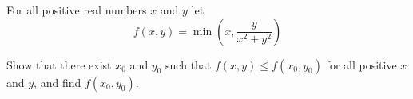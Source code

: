 For all positive real numbers $x$ and $y$ let\[f(x,y)=\min\left( x,\frac{y}{x^2+y^2}\right) \]

Show that there exist $x_0$ and $y_0$ such that $f(x, y)\le f(x_0, y_0)$ for all positive $x$ and $y$,  and find $f(x_0,y_0)$.